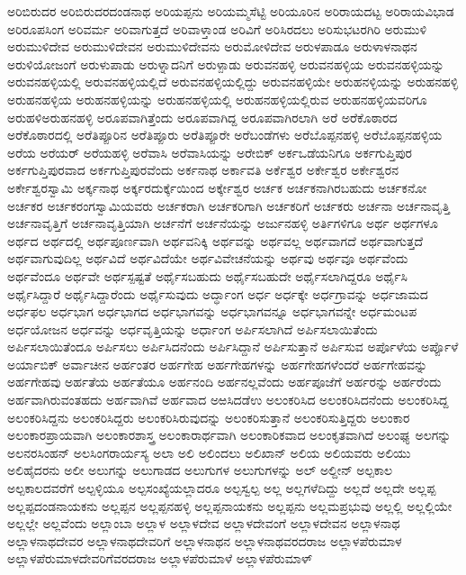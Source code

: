 {ಅರಿಬಿರುದರ
ಅರಿಬಿರುದರದಂಡನಾಥ
ಅರಿಯಪ್ಪನು
ಅರಿಯಮ್ಮಸೆಟ್ಟಿ
ಅರಿಯೂರಿನ
ಅರಿರಾಯದಟ್ಟ
ಅರಿರಾಯವಿಭಾಡ
ಅರಿರೂಪಸಿಂಗ
ಅರಿವರ್ಮ
ಅರಿವಾಗುತ್ತದೆ
ಅರಿವಾಳ್ತಾಂಡ
ಅರಿವಿಗೆ
ಅರಿಸಿರದಲು
ಅರಿಸುಭಟರಗಿರಿ
ಅರುಮುಳಿ
ಅರುಮುಳಿದೇವ
ಅರುಮುಳಿದೇವನ
ಅರುಮುಳಿದೇವನು
ಅರುಮೋಳಿದೇವ
ಅರುಳಪಾಡೂ
ಅರುಳಾಳನಾಥನ
ಅರುಳಿಯೋಜಂಗೆ
ಅರುಳುಪಾಡು
ಅರುಳ್ನಾದನಿಗೆ
ಅರುಳ್ಪಾಡು
ಅರುವನಹಳ್ಳಿ
ಅರುವನಹಳ್ಳಿಯ
ಅರುವನಹಳ್ಳಿಯನ್ನು
ಅರುವನಹಳ್ಳಿಯಲ್ಲಿ
ಅರುವನಹಳ್ಳಿಯಲ್ಲಿದೆ
ಅರುವನಹಳ್ಳಿಯಲ್ಲಿದ್ದು
ಅರುವನಹಳ್ಳಿಯೇ
ಅರುಹನಳ್ಳಿಯನ್ನು
ಅರುಹನಹಳ್ಳಿ
ಅರುಹನಹಳ್ಳಿಯ
ಅರುಹನಹಳ್ಳಿಯನ್ನು
ಅರುಹನಹಳ್ಳಿಯಲ್ಲಿ
ಅರುಹನಹಳ್ಳಿಯಲ್ಲಿರುವ
ಅರುಹನಹಳ್ಳಿಯವರಿಗೂ
ಅರುಹಳಿಅರುಹನಹಳ್ಳಿ
ಅರೂಪವಾಗಿತ್ತೆಂದು
ಅರೂಪವಾಗಿದ್ದ
ಅರೂಪವಾಗಿರಲಾಗಿ
ಅರೆ
ಅರೆಕೊಠಾರದ
ಅರೆಕೊಠಾರದಲ್ಲಿ
ಅರೆತಿಪ್ಪೂರಿನ
ಅರೆತಿಪ್ಪೂರು
ಅರೆತಿಪ್ಪೂರೇ
ಅರೆಬಂಡೆಗಳು
ಅರೆಬೊಪ್ಪನಹಳ್ಳಿ
ಅರೆಬೊಪ್ಪನಹಳ್ಳಿಯ
ಅರೆಯ
ಅರೆಯರ್
ಅರೆಯಹಳ್ಳಿ
ಅರೆವಾಸಿ
ಅರೆವಾಸಿಯನ್ನು
ಅರೇಬಿಕ್
ಅರ್ಕಒಡೆಯನಿಗೂ
ಅರ್ಕಗುಪ್ತಿಪುರ
ಅರ್ಕಗುಪ್ತಿಪುರವಾದ
ಅರ್ಕಗುಪ್ತಿಪುರವೆಂದು
ಅರ್ಕನಾಥ
ಅರ್ಕಾವತಿ
ಅರ್ಕೆಶ್ವರ
ಅರ್ಕೇಶ್ವರ
ಅರ್ಕೇಶ್ವರನ
ಅರ್ಕೇಶ್ವರಸ್ವಾಮಿ
ಅರ್ಕ್ಕನಾಥ
ಅರ್ಕ್ಕರದುರ್ಕ್ಕೆಯಿಂದ
ಅರ್ಕ್ಕೇಶ್ವರ
ಅರ್ಚಕ
ಅರ್ಚಕನಾಗಿರಬಹುದು
ಅರ್ಚಕನೋ
ಅರ್ಚಕರ
ಅರ್ಚಕರಂಗಸ್ವಾಮಿಯವರು
ಅರ್ಚಕರಾಗಿ
ಅರ್ಚಕರಿಗಾಗಿ
ಅರ್ಚಕರಿಗೆ
ಅರ್ಚಕರು
ಅರ್ಚನಾ
ಅರ್ಚನಾವೃತ್ತಿ
ಅರ್ಚನಾವೃತ್ತಿಗೆ
ಅರ್ಚನಾವೃತ್ತಿಯಾಗಿ
ಅರ್ಚನೆಗೆ
ಅರ್ಚನೆಯನ್ನು
ಅರ್ಜುನಹಳ್ಳಿ
ಅರ್ತಿಗಳಿಗೂ
ಅರ್ಥ
ಅರ್ಥಗಳೂ
ಅರ್ಥದ
ಅರ್ಥದಲ್ಲಿ
ಅರ್ಥಪೂರ್ಣವಾಗಿ
ಅರ್ಥವನಿಕ್ಕಿ
ಅರ್ಥವನ್ನು
ಅರ್ಥವಲ್ಲ
ಅರ್ಥವಾಗದೆ
ಅರ್ಥವಾಗುತ್ತದೆ
ಅರ್ಥವಾಗುವುದಿಲ್ಲ
ಅರ್ಥವಿದೆ
ಅರ್ಥವಿದೆಯೇ
ಅರ್ಥವಿವೇಚನೆಯನ್ನು
ಅರ್ಥವು
ಅರ್ಥವೂ
ಅರ್ಥವೆಂದು
ಅರ್ಥವೆಂದೂ
ಅರ್ಥವೇ
ಅರ್ಥಸ್ಪಷ್ಟತೆ
ಅರ್ಥೈಸಬಹುದು
ಅರ್ಥೈಸಬಹುದೇ
ಅರ್ಥೈಸಲಾಗಿದ್ದರೂ
ಅರ್ಥೈಸಿ
ಅರ್ಥೈಸಿದ್ದಾರೆ
ಅರ್ಥೈಸಿದ್ದಾರೆಂದು
ಅರ್ಥೈಸುವುದು
ಅರ್ದ್ಧಾಂಗ
ಅರ್ಧ
ಅರ್ಧಕ್ಕೇ
ಅರ್ಧಗ್ರಾವನ್ನು
ಅರ್ಧಜಾಮದ
ಅರ್ಧಫಲ
ಅರ್ಧಭಾಗ
ಅರ್ಧಭಾಗದ
ಅರ್ಧಭಾಗವನ್ನು
ಅರ್ಧಭಾಗವನ್ನೂ
ಅರ್ಧಭಾಗವನ್ನೇ
ಅರ್ಧಮಂಟಪ
ಅರ್ಧಯೋಜನ
ಅರ್ಧವನ್ನು
ಅರ್ಧವೃತ್ತಿಯನ್ನು
ಅರ್ಧಾಂಗ
ಅರ್ಪಿಸಲಾಗಿದೆ
ಅರ್ಪಿಸಲಾಯಿತೆಂದು
ಅರ್ಪಿಸಲಾಯಿತೆಂದೂ
ಅರ್ಪಿಸಲು
ಅರ್ಪಿಸಿದನೆಂದು
ಅರ್ಪಿಸಿದ್ದಾನೆ
ಅರ್ಪಿಸುತ್ತಾನೆ
ಅರ್ಪಿಸುವ
ಅರ್ಪೊಳೆಯ
ಅರ್ಪ್ಪೊಳೆ
ಅರ್ಯಾಬಿಕ್
ಅರ್ವಾಚೀನ
ಅರ್ಹಂತರ
ಅರ್ಹಗೇಹ
ಅರ್ಹಗೇಹಗಳನ್ನು
ಅರ್ಹಗೇಹಗಳೆಂದರೆ
ಅರ್ಹಗೇಹವನ್ನು
ಅರ್ಹಗೇಹವು
ಅರ್ಹತೆಯ
ಅರ್ಹತೆಯೂ
ಅರ್ಹನಂದಿ
ಅರ್ಹನಲ್ಲವೆಂದು
ಅರ್ಹಪೂಜೆಗೆ
ಅರ್ಹರನ್ನು
ಅರ್ಹರೆಂದು
ಅರ್ಹವಾಗಿರುವಂತಹದು
ಅರ್ಹವಾಗಿವೆ
ಅರ್ಹವಾದ
ಅಱಸಿದಡೆಉ
ಅಲಂಕರಿಸಿದ
ಅಲಂಕರಿಸಿದನೆಂದು
ಅಲಂಕರಿಸಿದ್ದ
ಅಲಂಕರಿಸಿದ್ದನು
ಅಲಂಕರಿಸಿದ್ದರು
ಅಲಂಕರಿಸಿರುವುದನ್ನು
ಅಲಂಕರಿಸುತ್ತಾನೆ
ಅಲಂಕರಿಸುತ್ತಿದ್ದರು
ಅಲಂಕಾರ
ಅಲಂಕಾರಪ್ರಾಯವಾಗಿ
ಅಲಂಕಾರಶಾಸ್ತ್ರ
ಅಲಂಕಾರಾರ್ಥವಾಗಿ
ಅಲಂಕಾರಿಕವಾದ
ಅಲಂಕೃತವಾಗಿದೆ
ಅಲಂಘ್ಯ
ಅಲಗನ್ನು
ಅಲನರಸಿಂಹನ್
ಅಲಸಿಂಗರಾರ್ಯಸ್ಯ
ಅಲಾ
ಅಲಿ
ಅಲಿಂದಲು
ಅಲಿಖಾನ್
ಅಲಿಯ
ಅಲಿಯವರು
ಅಲಿಯು
ಅಲಿಹೈದರನು
ಅಲೀ
ಅಲುಗನ್ನು
ಅಲುಗಾಡದ
ಅಲುಗುಗಳ
ಅಲುಗುಗಳನ್ನು
ಅಲ್
ಅಲ್ದೀನ್
ಅಲ್ಪಕಾಲ
ಅಲ್ಪಕಾಲದವರೆಗೆ
ಅಲ್ಪಳ್ಳಿಯೂ
ಅಲ್ಪಸಂಖ್ಯೆಯಲ್ಲಾದರೂ
ಅಲ್ಪಸ್ವಲ್ಪ
ಅಲ್ಲ
ಅಲ್ಲಗಳೆದಿದ್ದು
ಅಲ್ಲದೆ
ಅಲ್ಲದೇ
ಅಲ್ಲಪ್ಪ
ಅಲ್ಲಪ್ಪದಂಡನಾಯಕನು
ಅಲ್ಲಪ್ಪನ
ಅಲ್ಲಪ್ಪನಹಳ್ಳಿ
ಅಲ್ಲಪ್ಪನಾಯಕನು
ಅಲ್ಲಪ್ಪನು
ಅಲ್ಲಮಪ್ರಭುವು
ಅಲ್ಲಲ್ಲಿ
ಅಲ್ಲಲ್ಲಿಯೇ
ಅಲ್ಲಲ್ಲೇ
ಅಲ್ಲವೆಂದು
ಅಲ್ಲಾಂಬಾ
ಅಲ್ಲಾಳ
ಅಲ್ಲಾಳದೇವ
ಅಲ್ಲಾಳದೇವಂಗೆ
ಅಲ್ಲಾಳದೇವನ
ಅಲ್ಲಾಳನಾಥ
ಅಲ್ಲಾಳನಾಥದೇವರ
ಅಲ್ಲಾಳನಾಥದೇವರಿಗೆ
ಅಲ್ಲಾಳನಾಥನ
ಅಲ್ಲಾಳನಾಥವರದರಾಜ
ಅಲ್ಲಾಳಪೆರುಮಾಳ
ಅಲ್ಲಾಳಪೆರುಮಾಳದೇವರಿಗೆವರದರಾಜ
ಅಲ್ಲಾಳಪೆರುಮಾಳೆ
ಅಲ್ಲಾಳಪೆರುಮಾಳ್
}
